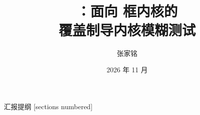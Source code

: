 \documentclass[aspectratio=169,10pt,fontset=none,zihao=false]{ctexbeamer}
\title{\sa{}：面向 \aster{} 框内核的\\覆盖制导内核模糊测试}
\author{张家铭}
\institute{北京科技大学\quad RustTrace 队\\[2pt]
  \scriptsize\faGithub\ \url{\repourl}}
\date{2026 年 11 月}
\begin{document}
\maketitle

\begin{frame}{汇报提纲}
  [sections numbered]
  \tableofcontents
\end{frame}







\end{document}
